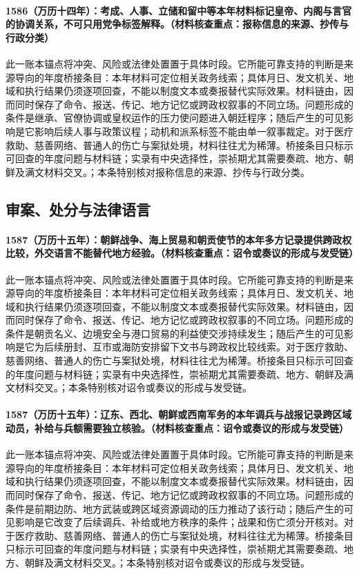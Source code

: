 \paragraph{1586（万历十四年）：考成、人事、立储和留中等本年材料标记皇帝、内阁与言官的协调关系，不可只用党争标签解释。（材料核查重点：报称信息的来源、抄传与行政分类）} 此一账本锚点将冲突、风险或法律处置置于具体时段。它所能可靠支持的判断是来源导向的年度桥接条目：本年材料可定位相关政务线索；具体月日、发文机关、地域和执行结果仍须逐项回查，不能以制度文本或奏报替代实际效果。材料链由，因而同时保存了命令、报送、传记、地方记忆或跨政权叙事的不同立场。问题形成的条件是继承、官僚协调或皇权运作的压力使问题进入朝廷程序；随后产生的可见影响是它影响后续人事与政策议程；动机和派系标签不能由单一叙事裁定。对于医疗救助、慈善网络、普通人的伤亡与案狱处境，材料往往尤为稀薄。桥接条目只标示可回查的年度问题与材料链；实录有中央选择性，崇祯期尤其需要奏疏、地方、朝鲜及满文材料交叉。；本条特别核对报称信息的来源、抄传与行政分类。

\subsection{审案、处分与法律语言}

\paragraph{1587（万历十五年）：朝鲜战争、海上贸易和朝贡使节的本年多方记录提供跨政权比较，外交语言不能替代地方经验。（材料核查重点：诏令或奏议的形成与发受链）} 此一账本锚点将冲突、风险或法律处置置于具体时段。它所能可靠支持的判断是来源导向的年度桥接条目：本年材料可定位相关政务线索；具体月日、发文机关、地域和执行结果仍须逐项回查，不能以制度文本或奏报替代实际效果。材料链由，因而同时保存了命令、报送、传记、地方记忆或跨政权叙事的不同立场。问题形成的条件是朝贡名义、边境安全与港口贸易的利益使交涉持续发生；随后产生的可见影响是它为后续册封、互市或海防安排留下文书与跨政权比较线索。对于医疗救助、慈善网络、普通人的伤亡与案狱处境，材料往往尤为稀薄。桥接条目只标示可回查的年度问题与材料链；实录有中央选择性，崇祯期尤其需要奏疏、地方、朝鲜及满文材料交叉。；本条特别核对诏令或奏议的形成与发受链。

\paragraph{1587（万历十五年）：辽东、西北、朝鲜或西南军务的本年调兵与战报记录跨区域动员，补给与兵额需要独立核验。（材料核查重点：诏令或奏议的形成与发受链）} 此一账本锚点将冲突、风险或法律处置置于具体时段。它所能可靠支持的判断是来源导向的年度桥接条目：本年材料可定位相关政务线索；具体月日、发文机关、地域和执行结果仍须逐项回查，不能以制度文本或奏报替代实际效果。材料链由，因而同时保存了命令、报送、传记、地方记忆或跨政权叙事的不同立场。问题形成的条件是前期边防、地方武装或跨区域资源调动的压力推动了该行动；随后产生的可见影响是它改变了后续调兵、补给或地方秩序的条件；战果和伤亡须分开核对。对于医疗救助、慈善网络、普通人的伤亡与案狱处境，材料往往尤为稀薄。桥接条目只标示可回查的年度问题与材料链；实录有中央选择性，崇祯期尤其需要奏疏、地方、朝鲜及满文材料交叉。；本条特别核对诏令或奏议的形成与发受链。

